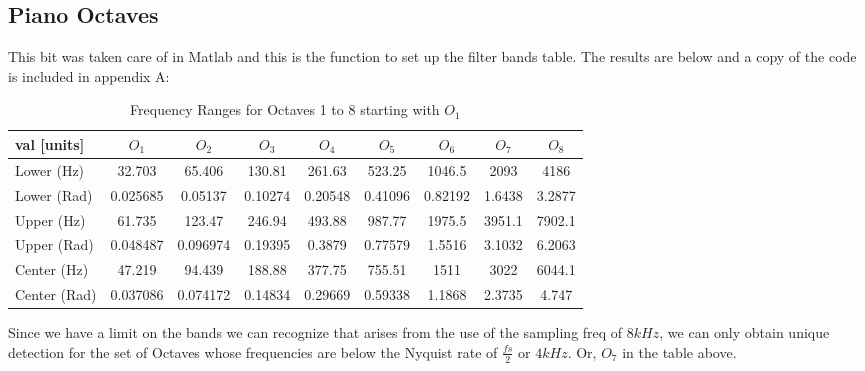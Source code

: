 \documentclass[a4paper, 11pt]{exam}
\begin{document}
\subsection{Piano Octaves}
This bit was taken care of in Matlab and this is the function to set up the filter bands table. The results are below and a copy of the code is included in appendix A:
\begin{table}[!ht]
\centering
\begin{tabular}{|l|c|c|c|c|c|c|c|c|}
\hline
val [units] & $O_1$  & $O_2$ & $O_3$ & $O_4$ & $O_5$ & $O_6$ & $O_7$ & $O_8$ \\
\hline
Lower (Hz)   & 32.703 & 65.406   & 130.81   & 261.63   & 523.25   & 1046.5   & 2093     & 4186    \\
\hline
Lower (Rad)  & 0.025685 & 0.05137  & 0.10274  & 0.20548  & 0.41096  & 0.82192  & 1.6438   & 3.2877  \\
\hline
Upper (Hz)   & 61.735 & 123.47   & 246.94   & 493.88   & 987.77   & 1975.5   & 3951.1   & 7902.1  \\
\hline
Upper (Rad) & 0.048487 & 0.096974 & 0.19395  & 0.3879   & 0.77579  & 1.5516   & 3.1032   & 6.2063  \\
\hline
Center (Hz)  & 47.219 & 94.439   & 188.88   & 377.75   & 755.51   & 1511     & 3022     & 6044.1  \\
\hline
Center (Rad) & 0.037086 & 0.074172 & 0.14834  & 0.29669  & 0.59338  & 1.1868   & 2.3735   & 4.747   \\
\hline
\end{tabular}
\caption{Frequency Ranges for Octaves 1 to 8 starting with $O_1$}
\end{table}
Since we have a limit on the bands we can recognize that arises from the use of the sampling freq of $8kHz$, we can only obtain unique detection for the set of Octaves whose frequencies are below the Nyquist rate of $\frac{fs}{2}$ or $4kHz$. Or, $O_7$ in the table above.
\end{document}
